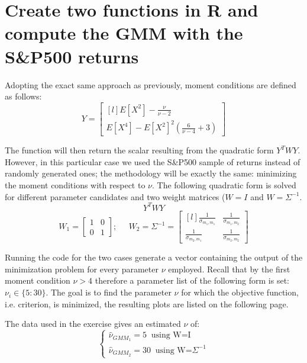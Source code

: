 \newpage
\section{Create two functions in R and compute the GMM with the S\&P500 returns}

Adopting the exact same approach as previously, moment conditions are defined as follows:
\begin{equation*}
    Y=    
    \begin{bmatrix}[l]
    E[X^2]-\frac{\nu}{\nu-2} \\
    E[X^4]-E[X^2]^2(\frac{6}{\nu-4}+3)
    \end{bmatrix}
\end{equation*}

The function will then return the scalar resulting from the quadratic form $Y^TWY$. However, in this particular case we used the S\&P500 sample of returns instead of randomly generated ones; the methodology will be exactly the same: minimizing the moment conditions with respect to $\nu$. The following quadratic form is solved for different parameter candidates and two weight matrices ($W=I$ and $W=\Sigma^{-1}$.
\begin{equation*}
    Y^TWY
\end{equation*}
\begin{equation*}
    W_1=
    \begin{bmatrix}
        1   &0 \\
        0   &1
    \end{bmatrix};\;\;\;\;\;
    W_2=\Sigma^{-1}=
    \begin{bmatrix}[l]
        \frac{1}{\sigma_{m_1,m_1}}    &\frac{1}{\sigma_{m_1,m_2}} \\
        \frac{1}{\sigma_{m_2,m_1}}    &\frac{1}{\sigma_{m_2,m_2}}
    \end{bmatrix}
\end{equation*}

Running the code for the two cases generate a vector containing the output of the minimization problem for every parameter $\nu$ employed. Recall that by the first moment condition $\nu>4$ therefore a parameter list of the following form is set: $\nu_i \in \{5:30\}$. The goal is to find the parameter $\nu$ for which the objective function, i.e. criterion, is minimized, the resulting plots are listed on the following page.
\bigskip\par
The data used in the exercise gives an estimated $\nu$ of:
\begin{equation*}
    \begin{cases}
    \widehat{\nu}_{GMM_{1}}=5 \;\;\text{using W=I}\\
    \widehat{\nu}_{GMM_{2}}=30 \;\;\text{using W=}\Sigma^{-1}
\end{cases}
\end{equation*}


